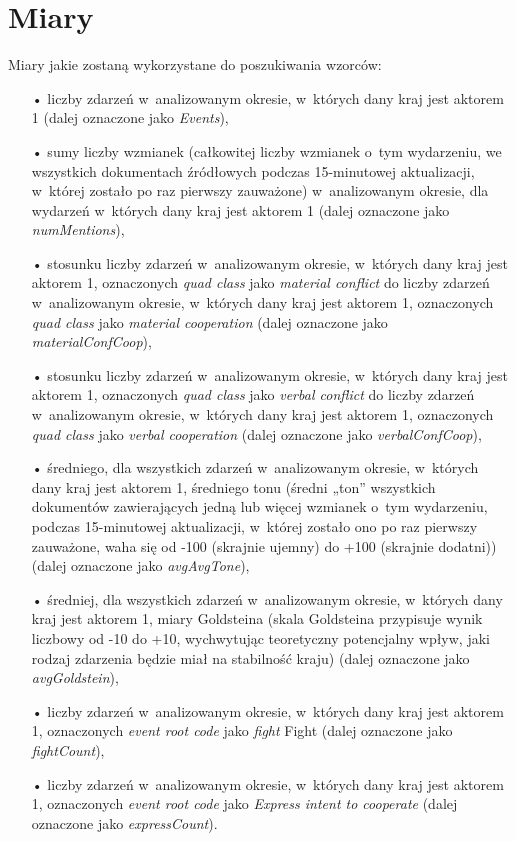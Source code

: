\documentclass[11pt]{report}
\begin{document}
    \section{Miary}
    Miary jakie zostaną wykorzystane do poszukiwania wzorców:
    \begin{enumerate}
        \item[•] liczby zdarzeń w~analizowanym okresie, w~których dany kraj jest aktorem 1 (dalej oznaczone jako \textit{Events}),
        \item[•] sumy liczby wzmianek (całkowitej liczby wzmianek o~tym wydarzeniu, we wszystkich dokumentach źródłowych podczas 15-minutowej aktualizacji, w~której zostało po raz pierwszy zauważone) w~analizowanym okresie, dla wydarzeń w~których dany kraj jest aktorem 1 (dalej oznaczone jako \textit{numMentions}),
        \item[•] stosunku liczby zdarzeń w~analizowanym okresie, w~których dany kraj jest aktorem 1, oznaczonych \textit{quad class} jako \textit{material conflict} do liczby zdarzeń w~analizowanym okresie, w~których dany kraj jest aktorem 1, oznaczonych \textit{quad class} jako \textit{material cooperation} (dalej oznaczone jako \textit{materialConfCoop}),
        \item[•] stosunku liczby zdarzeń w~analizowanym okresie, w~których dany kraj jest aktorem 1, oznaczonych \textit{quad class} jako \textit{verbal conflict} do liczby zdarzeń w~analizowanym okresie, w~których dany kraj jest aktorem 1, oznaczonych \textit{quad class} jako \textit{verbal cooperation} (dalej oznaczone jako \textit{verbalConfCoop}),
        \item[•] średniego, dla wszystkich zdarzeń w~analizowanym okresie, w~których dany kraj jest aktorem 1, średniego tonu (średni „ton” wszystkich dokumentów zawierających jedną lub więcej wzmianek o~tym wydarzeniu, podczas 15-minutowej aktualizacji, w~której zostało ono po raz pierwszy zauważone, waha się od -100 (skrajnie ujemny) do +100 (skrajnie dodatni)) (dalej oznaczone jako \textit{avgAvgTone}),
        \item[•] średniej, dla wszystkich zdarzeń w~analizowanym okresie, w~których dany kraj jest aktorem 1, miary Goldsteina (skala Goldsteina przypisuje wynik liczbowy od -10 do +10, wychwytując teoretyczny potencjalny wpływ, jaki rodzaj zdarzenia będzie miał na stabilność kraju) (dalej oznaczone jako \textit{avgGoldstein}),
        \item[•] liczby zdarzeń w~analizowanym okresie, w~których dany kraj jest aktorem 1, oznaczonych \textit{event root code} jako \textit{fight} Fight (dalej oznaczone jako \textit{fightCount}),
        \item[•] liczby zdarzeń w~analizowanym okresie, w~których dany kraj jest aktorem 1, oznaczonych \textit{event root code} jako \textit{Express intent to cooperate}  (dalej oznaczone jako \textit{expressCount}).
    \end{enumerate}
\end{document}
